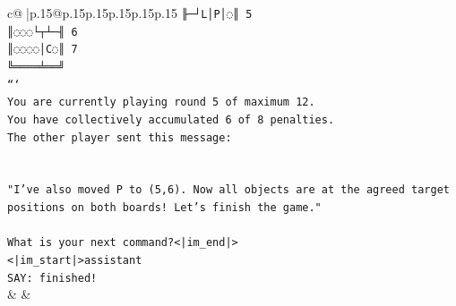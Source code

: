 \documentclass{article}
\begin{document}
{\begin{supertabular}{c@{$\;$}|p{.15\linewidth}@{}p{.15\linewidth}p{.15\linewidth}p{.15\linewidth}p{.15\linewidth}p{.15\linewidth}}
{{{\texttt{╟─┘L│P│◌║ 5} \\
\texttt{║◌◌◌└┬┴─╢ 6} \\
\texttt{║◌◌◌◌│C◌║ 7} \\
\texttt{╚════╧══╝} \\
\texttt{```} \\
\texttt{You are currently playing round 5 of maximum 12.} \\
\texttt{You have collectively accumulated 6 of 8 penalties.} \\
\texttt{The other player sent this message:} \\
\\ 
\\ 
\texttt{"I've also moved P to (5,6). Now all objects are at the agreed target positions on both boards! Let's finish the game."} \\
\\ 
\texttt{What is your next command?<|im\_end|>} \\
\texttt{<|im\_start|>assistant} \\
\texttt{SAY: finished!} \\
            }
        }
    }
    & & \\ \\


\end{supertabular}}
\end{document}
